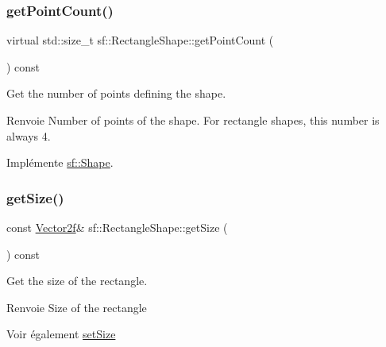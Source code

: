 \subsubsection{\texorpdfstring{get\+Point\+Count()}{getPointCount()}}
{\footnotesize\ttfamily virtual std\+::size\+\_\+t sf\+::\+Rectangle\+Shape\+::get\+Point\+Count (\begin{DoxyParamCaption}{ }\end{DoxyParamCaption}) const\hspace{0.3cm}{\ttfamily [virtual]}}



Get the number of points defining the shape. 

\begin{DoxyReturn}{Renvoie}
Number of points of the shape. For rectangle shapes, this number is always 4. 
\end{DoxyReturn}


Implémente \hyperlink{classsf_1_1Shape_af988dd61a29803fc04d02198e44b5643}{sf\+::\+Shape}.

\mbox{\label{classsf_1_1RectangleShape_ae54a07ff5537bf76de6748f592b34896}} 
\subsubsection{\texorpdfstring{get\+Size()}{getSize()}}
{\footnotesize\ttfamily const \hyperlink{classsf_1_1Vector2}{Vector2f}\& sf\+::\+Rectangle\+Shape\+::get\+Size (\begin{DoxyParamCaption}{ }\end{DoxyParamCaption}) const}



Get the size of the rectangle. 

\begin{DoxyReturn}{Renvoie}
Size of the rectangle
\end{DoxyReturn}
\begin{DoxySeeAlso}{Voir également}
\hyperlink{classsf_1_1RectangleShape_a5c65d374d4a259dfdc24efdd24a5dbec}{set\+Size} 
\end{DoxySeeAlso}
\mbox{\label{classsf_1_1RectangleShape_a5c65d374d4a259dfdc24efdd24a5dbec}} 

